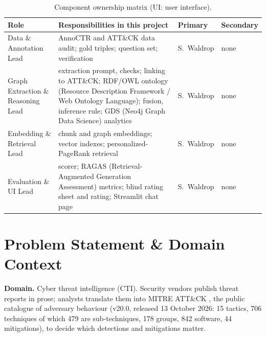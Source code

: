 \documentclass[10pt]{article}
\begin{document}
\begin{table}[H]\centering\small
\caption{Component ownership matrix (UI: user interface).}\label{tab:roles}
\begin{tabularx}{\textwidth}{@{}P{3.9cm}LP{2.1cm}P{1.5cm}@{}}
\toprule
Role & Responsibilities in this project & Primary & Secondary\\
\midrule
Data \& Annotation Lead & AnnoCTR and ATT\&CK data audit; gold triples; question set; verification & S.\ Waldrop & none\\
Graph Extraction \& Reasoning Lead & extraction prompt, checks; linking to ATT\&CK; RDF/OWL ontology (Resource Description Framework / Web Ontology Language); fusion, inference rule; GDS (Neo4j Graph Data Science) analytics & S.\ Waldrop & none\\
Embedding \& Retrieval Lead & chunk and graph embeddings; vector indexes; personalized-PageRank retrieval & S.\ Waldrop & none\\
Evaluation \& UI Lead & scorer; RAGAS (Retrieval-Augmented Generation Assessment) metrics; blind rating sheet and rating; Streamlit chat page & S.\ Waldrop & none\\
\bottomrule
\end{tabularx}
\end{table}

\section{Problem Statement \& Domain Context}
\textbf{Domain.} Cyber threat intelligence (CTI). Security vendors publish threat reports in prose; analysts translate them into MITRE ATT\&CK \cite{2}, the public catalogue of adversary behaviour (v20.0, released 13 October 2026: 15 tactics, 706 techniques of which 479 are sub-techniques, 178 groups, 842 software, 44 mitigations), to decide which detections and mitigations matter.
\end{document}
